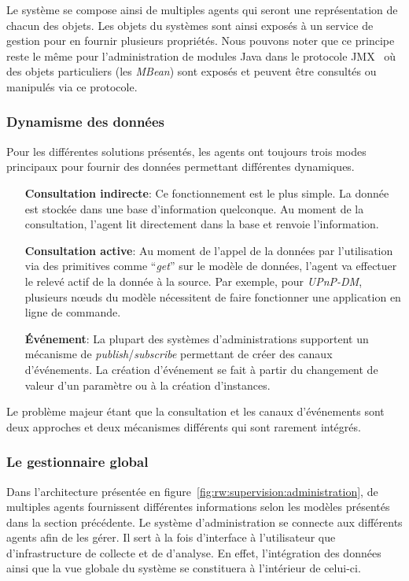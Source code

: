 Le système se compose ainsi de multiples agents qui seront une représentation de chacun des objets. Les objets du systèmes sont ainsi exposés à un service de gestion pour en fournir plusieurs propriétés. Nous pouvons noter que ce principe reste le même pour l'administration de modules Java dans le protocole JMX~\cite{Sun:JMX} où des objets particuliers (les \textit{MBean}) sont exposés et peuvent être consultés ou manipulés via ce protocole.

\subsubsection{Dynamisme des données}
Pour les différentes solutions présentés, les agents ont toujours trois modes principaux pour fournir des données permettant différentes dynamiques.
\begin{itemize}
	\item[\textbf{Consultation indirecte}: ] Ce fonctionnement est le plus simple. La donnée est stockée dans une base d'information quelconque. Au moment de la consultation, l'agent lit directement dans la base et renvoie l'information.
	\item[\textbf{Consultation active}: ] Au moment de l'appel de la données par l'utilisation via des primitives comme \enquote{\it get} sur le modèle de données, l'agent va effectuer le relevé actif de la donnée à la source. Par exemple, pour \textit{UPnP-DM}, plusieurs nœuds du modèle nécessitent de faire fonctionner une application en ligne de commande.
	\item[\textbf{Événement}: ] La plupart des systèmes d'administrations supportent un mécanisme de \textit{publish}/\textit{subscribe} permettant de créer des canaux d'événements. La création d'événement se fait à partir du changement de valeur d'un paramètre ou à la création d'instances. 
\end{itemize}

Le problème majeur étant que la consultation et les canaux d'événements sont deux approches et deux mécanismes différents qui sont rarement intégrés.

\subsubsection{Le gestionnaire global}
Dans l'architecture présentée en figure~\ref{fig:rw:supervision:administration}, de multiples agents fournissent différentes informations selon les modèles présentés dans la section précédente. Le système d'administration se connecte aux différents agents afin de les gérer. Il sert à la fois d'interface à l'utilisateur que d'infrastructure de collecte et de d'analyse. En effet, l'intégration des données ainsi que la vue globale du système se constituera à l'intérieur de celui-ci.

